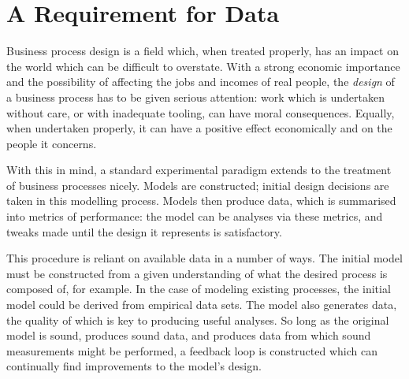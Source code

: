 \documentclass[12pt]{llncs}  %
\begin{document}
\maketitle


\section{A Requirement for Data}
\label{sec:intro}






Business process design is a field which, when treated properly, has an impact
on the world which can be difficult to overstate. With a strong economic
importance and the possibility of affecting the jobs and incomes of real people,
the \emph{design} of a business process has to be given serious attention: work
which is undertaken without care, or with inadequate tooling, can have moral
consequences. Equally, when undertaken properly, it can have a positive effect
economically and on the people it concerns.
\par

With this in mind, a standard experimental paradigm extends to the treatment of
business processes nicely. Models are constructed; initial design decisions are
taken in this modelling process. Models then produce data, which is summarised
into metrics of performance: the model can be analyses via these metrics, and
tweaks made until the design it represents is satisfactory.
\par


This procedure is reliant on available data in a number of ways. The initial
model must be constructed from a given understanding of what the desired process
is composed of, for example. In the case of modeling existing processes, the
initial model could be derived from empirical data sets. The model also
generates data, the quality of which is key to producing useful analyses. So
long as the original model is sound, produces sound data, and produces data from
which sound measurements might be performed, a feedback loop is constructed
which can continually find improvements to the model's design.
\par
\end{document}

